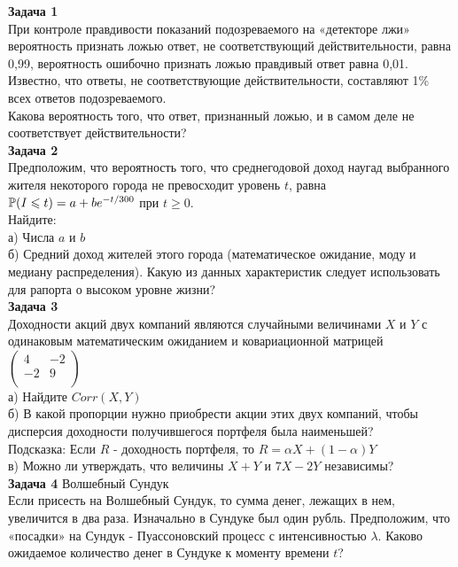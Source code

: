 \documentclass[12pt, a4paper]{article}\usepackage[]{graphicx}\usepackage[]{color}
\begin{document}
\textbf{Задача 1} \\ %
При контроле правдивости показаний подозреваемого на «детекторе лжи» вероятность признать ложью ответ, не соответствующий действительности, равна 0,99, вероятность ошибочно признать ложью правдивый ответ равна 0,01. Известно, что ответы, не соответствующие действительности, составляют 1\% всех ответов подозреваемого. \\
Какова вероятность того, что ответ, признанный ложью, и в самом деле не соответствует действительности?\\

\textbf{Задача 2} \\
Предположим, что вероятность того, что среднегодовой доход наугад выбранного жителя некоторого города не превосходит уровень $t$, равна $\P(I\le t)=a+be^{-t/300}$ при $t\ge 0$. \\
Найдите: \\
а) Числа $a$ и $b$ \\
б) Средний доход жителей этого города (математическое ожидание, моду и медиану распределения). Какую из данных характеристик следует использовать для рапорта о высоком уровне жизни? \\

\textbf{Задача 3} \\
Доходности акций двух компаний являются случайными величинами $X$ и $Y$ с одинаковым математическим ожиданием и ковариационной матрицей $\left( \begin{array}{cc}
   4 & -2  \\
   -2 & 9  \\
\end{array}\right)$  \\
а) Найдите $Corr(X,Y)$ \\
б) В какой пропорции нужно приобрести акции этих двух компаний, чтобы дисперсия доходности получившегося портфеля была наименьшей? \\
Подсказка: Если $R$ - доходность портфеля, то $R=\alpha X+(1-\alpha)Y$ \\
в) Можно ли утверждать, что величины $X+Y$ и $7X-2Y$ независимы? \\

\textbf{Задача 4} Волшебный Сундук \\
Если присесть на Волшебный Сундук, то сумма денег, лежащих в нем, увеличится в два раза. Изначально в Сундуке был один рубль. Предположим, что «посадки» на Сундук - Пуассоновский процесс с интенсивностью $\lambda$. Каково ожидаемое количество денег в Сундуке к моменту времени $t$? \\
\end{document}
